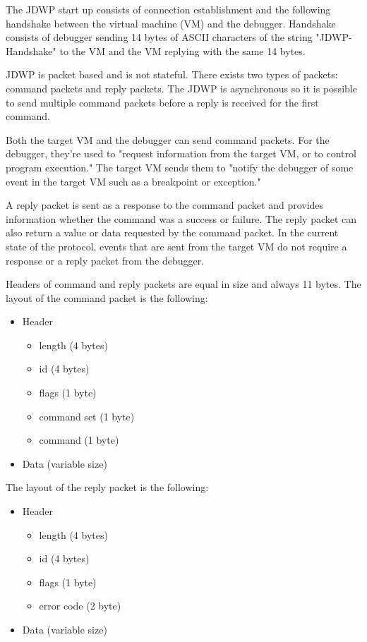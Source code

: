 \documentclass[..thesis.tex]{subfiles}
\begin{document}
The JDWP start up consists of connection establishment and the following handshake between the virtual machine (VM) and the debugger.
Handshake consists of debugger sending 14 bytes of ASCII characters of the string "JDWP-Handshake" to the VM and the VM replying with the same 14 bytes.\cite{oracle_jdwp_spec}

JDWP is packet based and is not stateful. There exists two types of packets: command packets and reply packets.
The JDWP is asynchronous so it is possible to send multiple command packets before a reply is received for the first command.

Both the target VM and the debugger can send command packets. For the debugger, they're used to "request information from the target VM, or to control program execution."
The target VM sends them to "notify the debugger of some event in the target VM such as a breakpoint or exception."\cite{oracle_jdwp_spec}

A reply packet is sent as a response to the command packet and provides information whether the command was a success or failure. The reply packet can also return a value or data requested by the command packet. In the current state of the protocol, events that are sent from the target VM do not require a response or a reply packet from the debugger.\cite{oracle_jdwp_spec}

Headers of command and reply packets are equal in size and always 11 bytes. The layout of the command packet is the following:
\begin{itemize}[nosep]
  \item Header
    \begin{itemize}[nosep]
      \item length (4 bytes)
      \item id (4 bytes)
      \item flags (1 byte)
      \item command set (1 byte)
      \item command (1 byte)
    \end{itemize}
  \item Data (variable size) 
\end{itemize}

The layout of the reply packet is the following:
\begin{itemize}[nosep]
  \item Header
    \begin{itemize}[nosep]
      \item length (4 bytes)
      \item id (4 bytes)
      \item flags (1 byte)
      \item error code (2 byte)
    \end{itemize}
  \item Data (variable size) 
\end{itemize}
\end{document}
